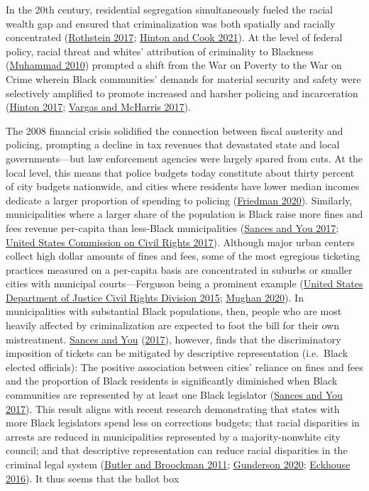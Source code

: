 \documentclass[
  12pt,
]{article}
\begin{document}
In the 20th century, residential segregation simultaneously fueled the racial wealth gap and ensured that criminalization was both spatially and racially concentrated (\protect\hyperlink{ref-Rothstein2017}{Rothstein 2017}; \protect\hyperlink{ref-Hinton2021}{Hinton and Cook 2021}). At the level of federal policy, racial threat and whites' attribution of criminality to Blackness (\protect\hyperlink{ref-Muhammad2010}{Muhammad 2010}) prompted a shift from the War on Poverty to the War on Crime wherein Black communities' demands for material security and safety were selectively amplified to promote increased and harsher policing and incarceration (\protect\hyperlink{ref-Hinton2017}{Hinton 2017}; \protect\hyperlink{ref-Vargas2017a}{Vargas and McHarris 2017}).

The 2008 financial crisis solidified the connection between fiscal austerity and policing, prompting a decline in tax revenues that devastated state and local governments---but law enforcement agencies were largely spared from cuts. At the local level, this means that police budgets today constitute about thirty percent of city budgets nationwide, and cities where residents have lower median incomes dedicate a larger proportion of spending to policing (\protect\hyperlink{ref-Friedman2020}{Friedman 2020}). Similarly, municipalities where a larger share of the population is Black raise more fines and fees revenue per-capita than less-Black municipalities (\protect\hyperlink{ref-Sances2017}{Sances and You 2017}; \protect\hyperlink{ref-UnitedStatesCommissiononCivilRights2017}{United States Commission on Civil Rights 2017}). Although major urban centers collect high dollar amounts of fines and fees, some of the most egregious ticketing practices measured on a per-capita basis are concentrated in suburbs or smaller cities with municipal courts---Ferguson being a prominent example (\protect\hyperlink{ref-UnitedStatesDepartmentofJusticeCivilRightsDivision2015}{United States Department of Justice Civil Rights Division 2015}; \protect\hyperlink{ref-Mughan2020}{Mughan 2020}). In municipalities with substantial Black populations, then, people who are most heavily affected by criminalization are expected to foot the bill for their own mistreatment. \protect\hyperlink{ref-Sances2017}{Sances and You} (\protect\hyperlink{ref-Sances2017}{2017}), however, finds that the discriminatory imposition of tickets can be mitigated by descriptive representation (i.e.~Black elected officials): The positive association between cities' reliance on fines and fees and the proportion of Black residents is significantly diminished when Black communities are represented by at least one Black legislator (\protect\hyperlink{ref-Sances2017}{Sances and You 2017}). This result aligns with recent research demonstrating that states with more Black legislators spend less on corrections budgets; that racial disparities in arrests are reduced in municipalities represented by a majority-nonwhite city council; and that descriptive representation can reduce racial disparities in the criminal legal system (\protect\hyperlink{ref-Butler2011}{Butler and Broockman 2011}; \protect\hyperlink{ref-Gunderson2020}{Gunderson 2020}; \protect\hyperlink{ref-Eckhouse2016}{Eckhouse 2016}). It thus seems that the ballot box 
\end{document}
